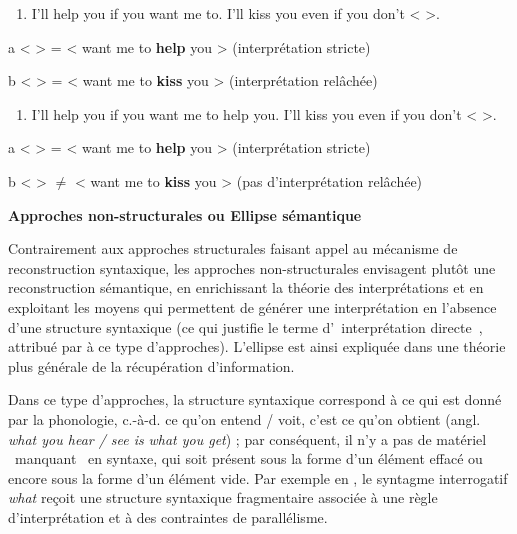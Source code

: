 \begin{enumerate}
\item \label{bkm:Ref305539527}I'll help you if you want me to. I'll kiss you even if you don't {\textless} {\textgreater}.  


\end{enumerate}
a  {\textless} {\textgreater} = {\textless} want me to \textbf{help} you {\textgreater} (interprétation stricte) 

b    {\textless} {\textgreater} = {\textless} want me to \textbf{kiss} you {\textgreater} (interprétation relâchée)


\begin{enumerate}
\item \label{bkm:Ref305539809}I'll help you if you want me to help you. I'll kiss you even if you don't {\textless} {\textgreater}.  


\end{enumerate}
a  {\textless} {\textgreater} = {\textless} want me to \textbf{help} you {\textgreater} (interprétation stricte) 

b    {\textless} {\textgreater} ${\neq}$ {\textless} want me to \textbf{kiss} you {\textgreater} (pas d'interprétation relâchée) 

{\bfseries
Approches non-structurales ou Ellipse sémantique}

Contrairement aux approches structurales faisant appel au mécanisme de reconstruction syntaxique, les approches non-structurales envisagent plutôt une reconstruction sémantique, en enrichissant la théorie des interprétations et en exploitant les moyens qui permettent de générer une interprétation en l'absence d'une structure syntaxique (ce qui justifie le terme d'{\guillemotleft}~interprétation directe~{\guillemotright}, attribué par \citet{Merchant2004} à ce type d'approches). L'ellipse est ainsi expliquée dans une théorie plus générale de la récupération d'information.

Dans ce type d'approches, la structure syntaxique correspond à ce qui est donné par la phonologie, c.-à-d. ce qu'on entend / voit, c'est ce qu'on obtient (angl. \textit{what you hear / see is} \textit{what you get}) ; par conséquent, il n'y a pas de matériel {\guillemotleft}~manquant~{\guillemotright} en syntaxe, qui soit présent sous la forme d'un élément effacé ou encore sous la forme d'un élément vide. Par exemple en , le syntagme interrogatif\textit{ what} reçoit une structure syntaxique fragmentaire associée à une règle d'interprétation et à des contraintes de parallélisme.



